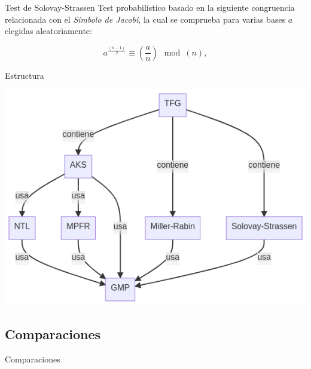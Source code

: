 \documentclass{beamer}
\begin{document}
\begin{frame}{Test de Solovay-Strassen}
	Test probabilístico basado en la siguiente congruencia relacionada con el \textit{Símbolo de Jacobi}, la cual se comprueba para varias bases $a$ elegidas aleatoriamente:\break
	
	\begin{equation}
	a^{\frac{(n-1)}{2}} \equiv \left(\frac{a}{n}\right) \mod(n),
	\end{equation}
\end{frame}

\begin{frame}{Estructura}
	\begin{alertblock}{}
		\begin{center}
			\includegraphics[scale=0.40]{../Memoria/img/diagrama-relaciones}
		\end{center}
	\end{alertblock}
\end{frame}

\subsection{Comparaciones}

\begin{frame}
	\centering
	\begin{Large}
		Comparaciones
	\end{Large}
\end{frame}
\end{document}
